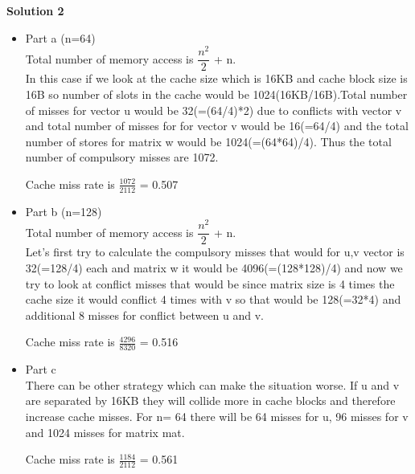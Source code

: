 \documentclass[letterpaper, 11pt]{article}
\begin{document}
\textbf{Solution 2}
\begin{itemize}
\item Part a (n=64) \\
Total number of memory access is $\dfrac{n^2}{2}$ + n. \\
In this case if we look at the cache size which is 16KB and cache block size is 16B so number of slots in the cache would be 1024(16KB/16B).Total number of misses for vector u would be 32(=(64/4)*2) due to conflicts with vector v and total number of misses for for vector v would be 16(=64/4) and the total number of stores for matrix w would be 1024(=(64*64)/4). Thus the total number of compulsory misses are 1072.
\begin{center}Cache miss rate is $\frac{1072}{2112}$ = 0.507 \end{center}
\item Part b (n=128) \\
Total number of memory access is $\dfrac{n^2}{2}$ + n. \\
Let's first try to calculate the compulsory misses that would for u,v vector is 32(=128/4) each and matrix w it would be 4096(=(128*128)/4) and now we try to look at conflict misses that would be since matrix size is 4 times the cache size it would conflict 4 times with v so that would be 128(=32*4) and additional 8 misses for conflict between u and v.
\begin{center}Cache miss rate is $\frac{4296}{8320}$ = 0.516 \end{center}
\item Part c \\
There can be other strategy which can make the situation worse. If u and v are separated by 16KB they will collide more in cache blocks and therefore increase cache misses.  For n= 64 there will be 64 misses for u, 96 misses for v and 1024 misses for matrix mat. \begin{center}Cache miss rate is $\frac{1184}{2112}$ = 0.561 \end{center}
\end{itemize}
\bigskip
\end{document}
